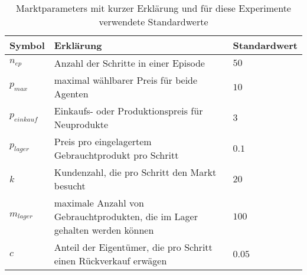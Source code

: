 \begin{table}[t]
    \centering
    \begin{tabular}{l p{}>{\bfseries}l}
        \toprule
        Symbol        & Erklärung                                                                   & Standardwert\\\midrule
        $n_{ep}$      & Anzahl der Schritte in einer Episode                                        & $50$\\
        $p_{max}$     & maximal wählbarer Preis für beide Agenten                                   & $10$\\
        $p_{einkauf}$ & Einkaufs- oder Produktionspreis für Neuprodukte                             & $3$\\
        $p_{lager}$   & Preis pro eingelagertem Gebrauchtprodukt pro Schritt                        & $0.1$\\
        $k$           & Kundenzahl, die pro Schritt den Markt besucht                               & $20$\\
        $m_{lager}$   & maximale Anzahl von Gebrauchtprodukten, die im Lager gehalten werden können & $100$\\
        $c$           & Anteil der Eigentümer, die pro Schritt einen Rückverkauf erwägen            & $0.05$\\\bottomrule
    \end{tabular}
    \caption{Marktparameters mit kurzer Erklärung und für diese Experimente verwendete Standardwerte}
    \label{tab:default_parameters}
\end{table}